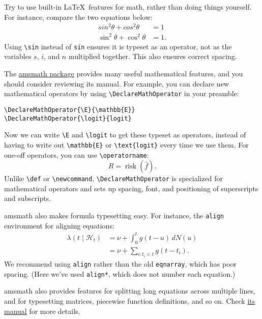 Try to use built-in \LaTeX\ features for math, rather than doing things
yourself. For instance, compare the two equations below:
\begin{align*}
  sin^2 \theta + cos^2 \theta &= 1\\
  \sin^2 \theta + \cos^2 \theta &= 1.
\end{align*}
Using \verb|\sin| instead of \verb|sin| ensures it is typeset as an operator,
not as the variables $s$, $i$, and $n$ multiplied together. This also ensures
correct spacing.

The
\href{http://mirrors.ctan.org/macros/latex/required/amsmath/amsldoc.pdf}{amsmath
  package} provides many useful mathematical features, and you should consider
reviewing its manual. For example, you can declare new mathematical operators by
using \verb|\DeclareMathOperator| in your preamble:
\begin{verbatim}
\DeclareMathOperator{\E}{\mathbb{E}}
\DeclareMathOperator{\logit}{logit}
\end{verbatim}
Now we can write \verb|\E| and \verb|\logit| to get these typeset as operators,
instead of having to write out \verb|\mathbb{E}| or \verb|\text{logit}| every
time we use them. For one-off operators, you can use \verb|\operatorname|:
\begin{equation}\label{eq:risk}
  R = \operatorname{risk}(\hat f).
\end{equation}
Unlike \verb|\def| or \verb|\newcommand|,
\verb|\DeclareMathOperator| is specialized for mathematical operators and sets
up spacing, font, and positioning of superscripts and subscripts.

amsmath also makes formula typesetting easy. For instance, the \texttt{align}
environment for aligning equations:
\begin{align*}
  \lambda(t \mid \mathcal{H}_t) &= \nu + \int_0^t g(t - u) \, d N(u)\\
                             &= \nu + \sum_{i: t_i < t} g(t - t_i).
\end{align*}
We recommend using \texttt{align} rather than the old \texttt{eqnarray}, which
has poor spacing. (Here we've used \texttt{align*}, which does not number each
equation.)

amsmath also provides features for splitting long equations across multiple
lines, and for typesetting matrices, piecewise function definitions, and so on.
Check
\href{http://mirrors.ctan.org/macros/latex/required/amsmath/amsldoc.pdf}{its
  manual} for more details.


